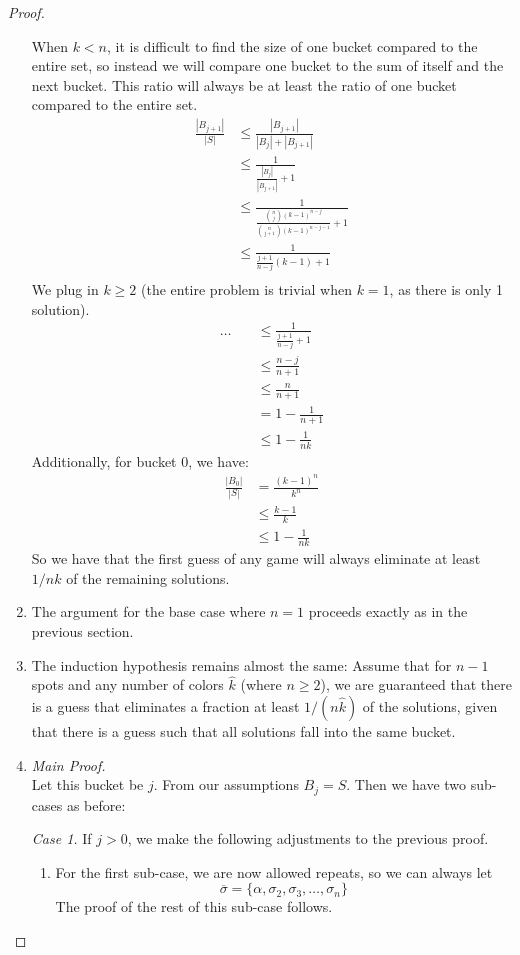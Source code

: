 \documentclass[12pt, a4paper]{article}
\begin{document}
\begin{proof}
\begin{enumerate}
		When $k<n$, it is difficult to find the size of one bucket compared to the
		entire set, so instead we will compare one bucket to the sum of itself
		and the next bucket. This ratio will always be at least the ratio of
		one bucket compared to the entire set.
			\begin{align*}
			\frac{|B_{j+1}|}{|S|}
			& \le \frac{|B_{j+1}|}{|B_j|+|B_{j+1}|}\\
			& \le \frac{1}{\frac{|B_j|}{|B_{j+1}|}+1}\\
			& \le \frac{1}{\frac{\binom{n}{j}(k-1)^{n-j}}
			{\binom{n}{j+1}(k-1)^{n-j-1}}+1}\\
			& \le \frac{1}{\frac{j+1}{n-j}(k-1)+1}\\
			\end{align*}
			We plug in $k \ge 2$ (the entire problem is trivial when $k = 1$, as
			there is only 1 solution).
			\begin{align*}
			\ldots\quad & \le \frac{1}{\frac{j+1}{n-j}+1}\\
			& \le \frac{n-j}{n+1}\\
			& \le \frac{n}{n+1}\\
			& = 1-\frac{1}{n+1}\\
			& \le 1-\frac{1}{nk}
			\end{align*}
		Additionally, for bucket 0, we have:
		\begin{align*}
			\frac{|B_{0}|}{|S|}
			& = \frac{(k-1)^n}{k^n}\\
			& \le \frac{k-1}{k}\\
			& \le 1-\frac{1}{nk}
		\end{align*}
		So we have that the first guess of any game will always eliminate at least
		$1/nk$ of the remaining solutions.
		\item The argument for the base case where $n=1$ proceeds exactly as in the
		previous section.
		\item The induction hypothesis remains almost the same: Assume that for $n-1$
		spots and any number
		of colors $\widehat{k}$ (where $n\ge 2$), we are guaranteed that
		there is a guess that eliminates a fraction at least $1/(n\widehat{k})$
		of the solutions, given that there is a guess such that all solutions fall into
		the same bucket.

		\item\textit{Main Proof.}\\
		Let this bucket be $j$. From our assumptions $B_j = S$. Then we have two
		sub-cases as before: 

		\textit{Case 1.} If $j>0$, we make the following adjustments to the previous
		proof.
		\begin{enumerate}[label=\roman*.]
		\item For the first sub-case, we are now allowed repeats, so we
		can always let
			\begin{equation*}
			\overline{\sigma}=\{\alpha, \sigma_2, \sigma_3, \ldots, \sigma_n\}
			\end{equation*}
		The proof of the rest of this sub-case follows.
		

\end{enumerate}
\end{enumerate}
\end{proof}
\end{document}
